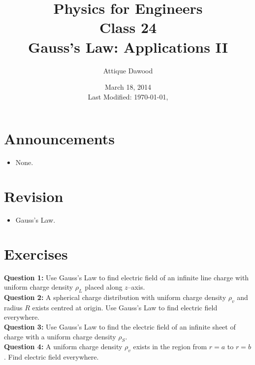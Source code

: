\documentclass[12pt,a4paper]{article}
\title{\vspace{-3cm}Physics for Engineers\\Class 24\\Gauss's Law: Applications II}
\author{Attique Dawood}
\date{March 18, 2014\\[0.2cm] Last Modified: \today, \currenttime}
\begin{document}
\maketitle
\section{Announcements}
\begin{itemize}
\item None.
\end{itemize}
\section{Revision}
\begin{itemize}
\item Gauss's Law.
\end{itemize}
\section{Exercises}
\noindent\textbf{Question 1:} Use Gauss's Law to find electric field of an infinite line charge with uniform charge density $\rho_L$ placed along $z$--axis.\\[0.2cm]
\noindent\textbf{Question 2:} A spherical charge distribution with uniform charge density $\rho_v$ and radius $R$ exists centred at origin. Use Gauss's Law to find electric field everywhere.\\[0.2cm]
\noindent\textbf{Question 3:} Use Gauss's Law to find the electric field of an infinite sheet of charge with a uniform charge density $\rho_S$.\\[0.2cm]
\noindent\textbf{Question 4:} A uniform charge density $\rho_v$ exists in the region from $r=a$ to $r=b$. Find electric field everywhere.\\[0.2cm]
%
%
\end{document}
